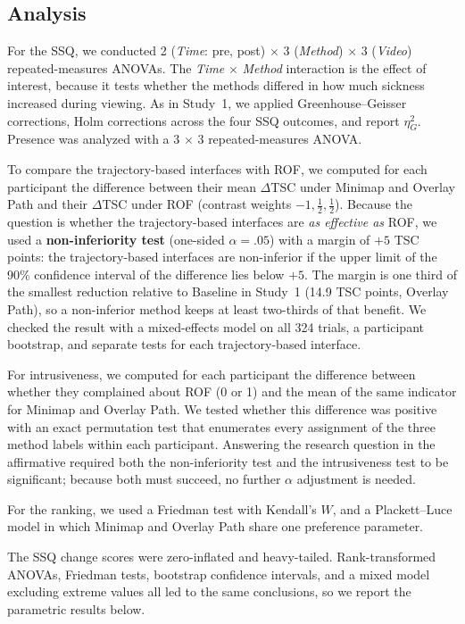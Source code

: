 \subsection{Analysis}

For the SSQ, we conducted 2 (\textit{Time}: pre, post) $\times$ 3
(\textit{Method}) $\times$ 3 (\textit{Video}) repeated-measures ANOVAs.
The \textit{Time} $\times$ \textit{Method} interaction is the effect of
interest, because it tests whether the methods differed in how much sickness
increased during viewing. As in Study~1, we applied Greenhouse--Geisser
corrections, Holm corrections across the four SSQ outcomes, and report
$\eta^2_G$. Presence was analyzed with a 3 $\times$ 3 repeated-measures ANOVA.

To compare the trajectory-based interfaces with ROF, we computed for each
participant the difference between their mean $\Delta$TSC under Minimap and
Overlay Path and their $\Delta$TSC under ROF (contrast weights
$-1, \frac{1}{2}, \frac{1}{2}$). Because the question is whether the
trajectory-based interfaces are \emph{as effective as} ROF, we used a
\textbf{non-inferiority test} (one-sided $\alpha = .05$) with a margin of
$+5$ TSC points: the trajectory-based interfaces are non-inferior if the upper
limit of the 90\% confidence interval of the difference lies below $+5$. The
margin is one third of the smallest reduction relative to Baseline in Study~1
(14.9 TSC points, Overlay Path), so a non-inferior method keeps at least
two-thirds of that benefit. We checked the result with a mixed-effects model on
all 324 trials, a participant bootstrap, and separate tests for each
trajectory-based interface.

For intrusiveness, we computed for each participant the difference between
whether they complained about ROF (0 or 1) and the mean of the same indicator
for Minimap and Overlay Path. We tested whether this difference was positive
with an exact permutation test that enumerates every assignment of the three
method labels within each participant. Answering the research question in the
affirmative required both the non-inferiority test and the intrusiveness test
to be significant; because both must succeed, no further $\alpha$ adjustment is
needed.

For the ranking, we used a Friedman test with Kendall's $W$, and a
Plackett--Luce model in which Minimap and Overlay Path share one preference
parameter.

The SSQ change scores were zero-inflated and heavy-tailed. Rank-transformed
ANOVAs, Friedman tests, bootstrap confidence intervals, and a mixed model
excluding extreme values all led to the same conclusions, so we report the
parametric results below.

